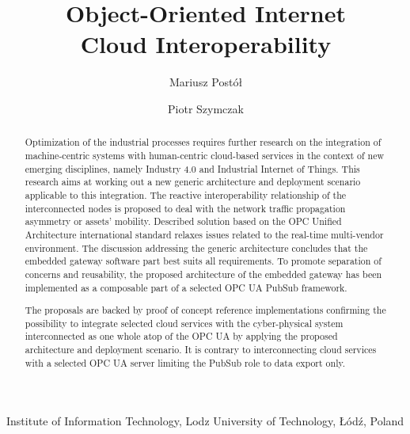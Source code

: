 \documentclass[runningheads]{llncs}
\begin{document}
\title{Object-Oriented Internet\\ Cloud Interoperability}

\author{Mariusz Postół  \and Piotr Szymczak }

\institute
{ Institute of Information Technology, Lodz University of Technology, Łódź, Poland \\
}

\maketitle

\begin{abstract}

      Optimization of the industrial processes requires further research on the integration of machine-centric systems with human-centric cloud-based services in the context of new emerging disciplines, namely Industry 4.0 and Industrial Internet of Things. This research aims at working out a new generic architecture and deployment scenario applicable to this integration. The reactive interoperability relationship of the interconnected nodes is proposed to deal with the network traffic propagation asymmetry or assets' mobility. Described solution based on the OPC Unified Architecture international standard relaxes issues related to the real-time multi-vendor environment. The discussion addressing the generic architecture concludes that the embedded gateway software part best suits all requirements. To promote separation of concerns and reusability, the proposed architecture of the embedded gateway has been implemented as a composable part of a selected OPC UA PubSub framework.

      The proposals are backed by proof of concept reference implementations confirming the possibility to integrate selected cloud services with the cyber-physical system interconnected as one whole atop of the OPC UA by applying the proposed architecture and deployment scenario. It is contrary to interconnecting cloud services with a selected OPC UA server limiting the PubSub role to data export only.


\end{abstract}
\end{document}
